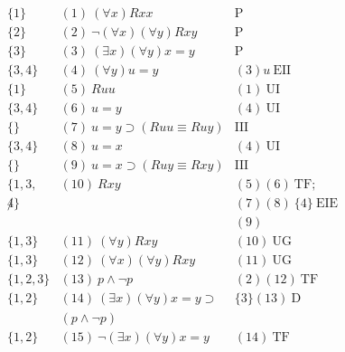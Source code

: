 \[
\begin{array}{lll}
\{1\}   & (1)\ (\forall x) Rxx  & \mathrm{P}\\
\{2\}   & (2)\ \neg (\forall x)(\forall y) Rxy  & \mathrm{P}\\
\{3\}   & (3)\ (\exists x)(\forall y) x = y  & \mathrm{P}\\
\{3,4\}   & (4)\ (\forall y) u = y  & (3)u\ \mathrm{EII}\\
\{1\}   & (5)\ Ruu  & (1)\ \mathrm{UI}\\
\{3,4\}   & (6)\ u=y  & (4)\ \mathrm{UI}\\
\{\}   & (7)\ u=y \supset (Ruu \equiv Ruy) & \mathrm{III}\\
\{3,4\}   & (8)\ u=x  & (4)\ \mathrm{UI}\\
\{\}   & (9)\ u=x \supset (Ruy \equiv Rxy) & \mathrm{III}\\
\{1,3,   & (10)\ Rxy  & (5)(6)\ \mathrm{TF};\\
\not4\} &  & (7)(8)\ \{4\}\ \mathrm{EIE} \\
 & & (9)\\
\{1,3\}   & (11)\ (\forall y)Rxy  & (10)\ \mathrm{UG}\\
\{1,3\}   & (12)\ (\forall x)(\forall y)Rxy  & (11)\ \mathrm{UG}\\
\{1,2,3\}   & (13)\ p \wedge \neg p  & (2)(12)\ \mathrm{TF}\\
\{1,2\}   & (14)\ (\exists x)(\forall y) x = y  \supset
& \{3\}(13)\ \mathrm{D}\\
 & (p \wedge \neg p) & \\
\{1,2\}   & (15)\ \neg (\exists x)(\forall y) x = y  & (14)\ \mathrm{TF}
\end{array}
\]
\fi
\fi